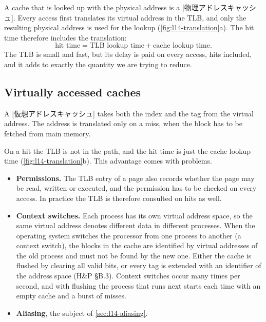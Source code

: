 \documentclass[../main.tex]{subfiles}
\begin{document}
A cache that is looked up with the physical address is a
[物理アドレスキャッシュ].  Every access first
translates its virtual address in the TLB, and only the resulting physical
address is used for the lookup (\cref{fig:l14-translation}a).  The hit time
therefore includes the translation:
\begin{equation}
  \text{hit time} = \text{TLB lookup time} + \text{cache lookup time} .
  \label{eq:l14-pa-hit}
\end{equation}
The TLB is small and fast, but its delay is paid on every access, hits
included, and it adds to exactly the quantity we are trying to
reduce.

\subsection{Virtually accessed caches}

\begin{definition}
  A [仮想アドレスキャッシュ] takes both the
  index and the tag from the virtual address.  The address is translated only
  on a miss, when the block has to be fetched from main memory.
\end{definition}

On a hit the TLB is not in the path, and the hit time is just the cache
lookup time (\cref{fig:l14-translation}b).  This advantage comes with
problems.
\begin{itemize}
  \item \textbf{Permissions.}  The TLB entry of a page also records whether
    the page may be read, written or executed, and the permission has to be
    checked on every access.  In practice the TLB is therefore consulted on
    hits as well.
  \item \textbf{Context switches.}  Each process has its own virtual address
    space, so the same virtual address denotes different data in different
    processes.  When the operating system switches the processor from one
    process to another (a context switch), the blocks in the cache are
    identified by virtual addresses of the old process and must not be found
    by the new one.  Either the cache is flushed by clearing all valid bits,
    or every tag is extended with an identifier of the address space (H\&P
    §B.3).  Context switches occur many times per second, and with flushing
    the process that runs next starts each time with an empty cache and a
    burst of misses.
  \item \textbf{Aliasing}, the subject of \cref{sec:l14-aliasing}.
\end{itemize}
\end{document}
